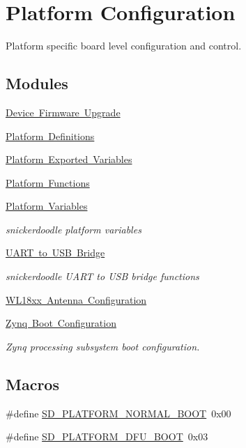 \hypertarget{group___s_d___platform}{}\section{Platform Configuration}
\label{group___s_d___platform}


Platform specific board level configuration and control.  


\subsection*{Modules}
\begin{DoxyCompactItemize}
\item 
\mbox{\hyperlink{group___s_d___d_f_u}{Device Firmware Upgrade}}
\item 
\mbox{\hyperlink{group___s_d___platform___defines}{Platform Definitions}}
\item 
\mbox{\hyperlink{group___s_d___platform___exported___variables}{Platform Exported Variables}}
\item 
\mbox{\hyperlink{group___s_d___platform___function___declarations}{Platform Functions}}
\item 
\mbox{\hyperlink{group___s_d___platform___variables}{Platform Variables}}
\begin{DoxyCompactList}\small\item\em snickerdoodle platform variables \end{DoxyCompactList}\item 
\mbox{\hyperlink{group___s_d___u_a_r_t___u_s_b___bridge}{U\+A\+R\+T to U\+S\+B Bridge}}
\begin{DoxyCompactList}\small\item\em snickerdoodle U\+A\+RT to U\+SB bridge functions \end{DoxyCompactList}\item 
\mbox{\hyperlink{group___s_d___platform___w_l18xx___ant}{W\+L18xx Antenna Configuration}}
\item 
\mbox{\hyperlink{group___s_d___platform___boot___config}{Zynq Boot Configuration}}
\begin{DoxyCompactList}\small\item\em Zynq processing subsystem boot configuration. \end{DoxyCompactList}\end{DoxyCompactItemize}
\subsection*{Macros}
\begin{DoxyCompactItemize}
\item 
\#define \mbox{\hyperlink{group___s_d___platform_ga086665d90c28883d36a12fa61ad26eaf}{S\+D\+\_\+\+P\+L\+A\+T\+F\+O\+R\+M\+\_\+\+N\+O\+R\+M\+A\+L\+\_\+\+B\+O\+OT}}~0x00
\item 
\#define \mbox{\hyperlink{group___s_d___platform_gaed22fc6c832ec83bcc4aa35bace12970}{S\+D\+\_\+\+P\+L\+A\+T\+F\+O\+R\+M\+\_\+\+D\+F\+U\+\_\+\+B\+O\+OT}}~0x03
\end{DoxyCompactItemize}
